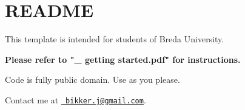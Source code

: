 \chapter{README}
\hypertarget{md__r_e_a_d_m_e}{}\label{md__r_e_a_d_m_e}
This template is intended for students of Breda University.

{\bfseries{Please refer to "{}\+\_\+ getting started.\+pdf"{} for instructions.}}

Code is fully public domain. Use as you please.

Contact me at \href{mailto:bikker.j@gmail.com}{\texttt{ bikker.\+j@gmail.\+com}}. 